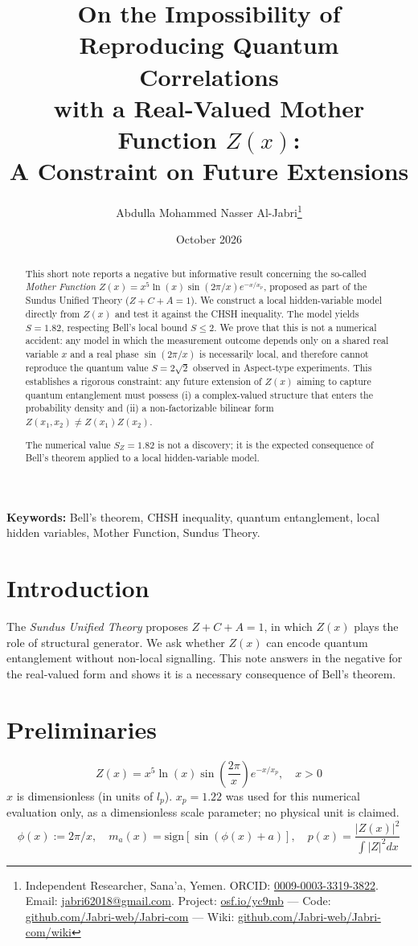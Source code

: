 \documentclass[11pt,a4paper]{article}
\title{
    On the Impossibility of Reproducing Quantum Correlations \\
    with a Real-Valued Mother Function $Z(x)$: \\
    A Constraint on Future Extensions
}
\author{
    Abdulla Mohammed Nasser Al-Jabri\thanks{Independent Researcher, Sana'a, Yemen.
    ORCID: \href{https://orcid.org/0009-0003-3319-3822}{0009-0003-3319-3822}.
    Email: \href{mailto:jabri62018@gmail.com}{jabri62018@gmail.com}.
    Project: \href{https://osf.io/yc9mb/}{osf.io/yc9mb} —
    Code: \href{https://github.com/Jabri-web/Jabri-com}{github.com/Jabri-web/Jabri-com} —
    Wiki: \href{https://github.com/Jabri-web/Jabri-com/wiki}{github.com/Jabri-web/Jabri-com/wiki}}
}
\date{October 2026}
\begin{document}
\maketitle
\thispagestyle{fancy}

\begin{abstract}
\noindent
This short note reports a negative but informative result concerning the
so-called \emph{Mother Function} $Z(x) = x^5 \ln(x) \sin(2\pi/x) e^{-x/x_p}$,
proposed as part of the Sundus Unified Theory ($Z + C + A = 1$).
We construct a local hidden-variable model directly from $Z(x)$ and test
it against the CHSH inequality. The model yields $S = 1.82$, respecting
Bell's local bound $S \leq 2$. We prove that this is not a numerical
accident: any model in which the measurement outcome depends only on a
shared real variable $x$ and a real phase $\sin(2\pi/x)$ is necessarily
local, and therefore cannot reproduce the quantum value $S = 2\sqrt{2}$
observed in Aspect-type experiments. This establishes a rigorous
constraint: any future extension of $Z(x)$ aiming to capture quantum
entanglement must possess (i) a complex-valued structure that enters the
probability density and (ii) a non-factorizable bilinear form
$Z(x_1, x_2) \neq Z(x_1) Z(x_2)$.

The numerical value $S_Z = 1.82$ is not a discovery; it is the expected
consequence of Bell's theorem applied to a local hidden-variable model.
\end{abstract}

\vspace{1em}
\noindent\textbf{Keywords:} Bell's theorem, CHSH inequality, quantum entanglement,
local hidden variables, Mother Function, Sundus Theory.

\section{Introduction}
The \emph{Sundus Unified Theory} proposes $Z + C + A = 1$, in which $Z(x)$
plays the role of structural generator. We ask whether $Z(x)$ can encode
quantum entanglement without non-local signalling. This note answers in
the negative for the real-valued form and shows it is a necessary consequence
of Bell's theorem.

\section{Preliminaries}
\begin{equation}
    Z(x) = x^5 \ln(x) \sin\!\left(\frac{2\pi}{x}\right) e^{-x/x_p},\quad x>0
\end{equation}
$x$ is dimensionless (in units of $l_p$). $x_p=1.22$ was used for this numerical
evaluation only, as a dimensionless scale parameter; no physical unit is claimed.
\begin{equation}
    \phi(x):=2\pi/x,\quad m_a(x)=\mathrm{sign}[\sin(\phi(x)+a)],\quad
    p(x)=\frac{|Z(x)|^2}{\int |Z|^2 dx}
\end{equation}
\end{document}
